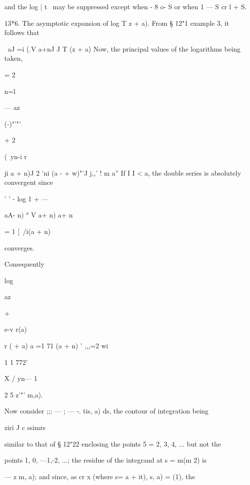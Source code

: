 {{and the log | t \ may be suppressed except when - 8 o- S or when 1 — S
cr l + S.

13*6. The asymptotic expansion of log T z + a). From § 12"1 example 3,
it follows that

\ aJ =i (.V a+nJ J T (z + a) Now, the principal values of the
logarithms being taken,



= 2

n=l



— az



  (-)"'"'



+ 2



(\ yn-i r



ji a + n)J 2 'ni (a - + w)"'J j,,' ! m a'' If I I < a, the double
series is absolutely convergent since



' ' - log 1 + —

 aA- n) ° V a+ n) a+ n



= 1 [\ /i(a + n)



converges.

Consequently



log



az



+



e-v r(a)

r ( + a) a =1 71 (a + n) ' ,,,=2 wi

1 1 772'



X / yn— 1

2 5 z'"' m,a).



Now consider ;;; — ; — -. tis, a) ds, the contour of integration being

ziri J c ssimrs

similar to that of § 12"22 enclosing the points 5 = 2, 3, 4, ... but
not the

points 1, 0, —1,-2, ...; the residue of the integrand at s = m(m 2) is

— z m, a); and since, as cr x (where s= a + it), s, a) = (1), the

}}
